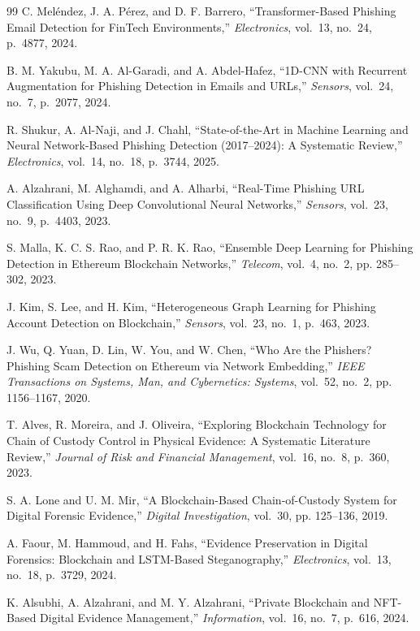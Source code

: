 \documentclass[conference]{IEEEtran}
\begin{document}
\begin{thebibliography}{99}
C. Meléndez, J. A. Pérez, and D. F. Barrero, ``Transformer-Based Phishing Email Detection for FinTech Environments,'' \textit{Electronics}, vol.~13, no.~24, p.~4877, 2024.

B. M. Yakubu, M. A. Al-Garadi, and A. Abdel-Hafez, ``1D-CNN with Recurrent Augmentation for Phishing Detection in Emails and URLs,'' \textit{Sensors}, vol.~24, no.~7, p.~2077, 2024.

R. Shukur, A. Al-Naji, and J. Chahl, ``State-of-the-Art in Machine Learning and Neural Network-Based Phishing Detection (2017–2024): A Systematic Review,'' \textit{Electronics}, vol.~14, no.~18, p.~3744, 2025.

A. Alzahrani, M. Alghamdi, and A. Alharbi, ``Real-Time Phishing URL Classification Using Deep Convolutional Neural Networks,'' \textit{Sensors}, vol.~23, no.~9, p.~4403, 2023.

S. Malla, K. C. S. Rao, and P. R. K. Rao, ``Ensemble Deep Learning for Phishing Detection in Ethereum Blockchain Networks,'' \textit{Telecom}, vol.~4, no.~2, pp. 285–302, 2023.

J. Kim, S. Lee, and H. Kim, ``Heterogeneous Graph Learning for Phishing Account Detection on Blockchain,'' \textit{Sensors}, vol.~23, no.~1, p.~463, 2023.

J. Wu, Q. Yuan, D. Lin, W. You, and W. Chen, ``Who Are the Phishers? Phishing Scam Detection on Ethereum via Network Embedding,'' \textit{IEEE Transactions on Systems, Man, and Cybernetics: Systems}, vol.~52, no.~2, pp. 1156–1167, 2020.

T. Alves, R. Moreira, and J. Oliveira, ``Exploring Blockchain Technology for Chain of Custody Control in Physical Evidence: A Systematic Literature Review,'' \textit{Journal of Risk and Financial Management}, vol.~16, no.~8, p.~360, 2023.

S. A. Lone and U. M. Mir, ``A Blockchain-Based Chain-of-Custody System for Digital Forensic Evidence,'' \textit{Digital Investigation}, vol.~30, pp. 125–136, 2019.

A. Faour, M. Hammoud, and H. Fahs, ``Evidence Preservation in Digital Forensics: Blockchain and LSTM-Based Steganography,'' \textit{Electronics}, vol.~13, no.~18, p.~3729, 2024.

K. Alsubhi, A. Alzahrani, and M. Y. Alzahrani, ``Private Blockchain and NFT-Based Digital Evidence Management,'' \textit{Information}, vol.~16, no.~7, p.~616, 2024.


\end{thebibliography}
\end{document}
